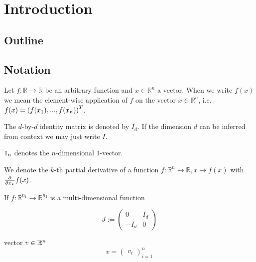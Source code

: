 \documentclass[twoside,a4paper]{article}
\begin{document}
\section{Introduction}

\subsection{Outline}

\subsection{Notation}

Let $f: \mathbb{R} \rightarrow \mathbb{R}$ be an arbitrary function and $x \in \mathbb{R}^n$
a vector. When we write $f(x)$ we mean the element-wise application of $f$ 
on the vector $x \in \mathbb{R}^n$, i.e. $f(x) = \left(
	f(x_1), ..., f(x_n)
\right)^T$.

The $d$-by-$d$ identity matrix is denoted by $I_d$. If the dimension $d$ can be inferred
from context we may just write $I$.

$1_{n}$ denotes the $n$-dimensional $1$-vector.


We denote the $k$-th partial derivative of a function $f: \mathbb{R}^n \to \mathbb{R},
x \mapsto f(x)$ with $\frac{\partial }{\partial x_k} f(x)$.

If $f: \mathbb{R}^{n_1} \to \mathbb{R}^{n_2}$ is a multi-dimensional function




\begin{equation*}
	J := \begin{pmatrix}
		0 & I_d \\
		-I_d & 0
	\end{pmatrix}
\end{equation*}

vector $v \in \mathbb{R}^n$
\begin{equation*}
	v = \begin{pmatrix}
		v_i
	\end{pmatrix}_{i=1}^n
\end{equation*}


%
%
\newpage
\end{document}
